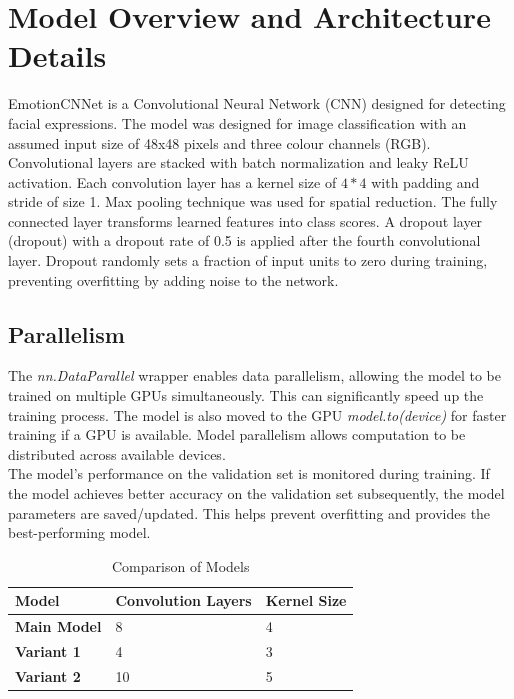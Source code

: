 \section{Model Overview and Architecture Details}
EmotionCNNet is a Convolutional Neural Network (CNN) designed for detecting facial expressions. The model was designed for image classification with an assumed input size of 48x48 pixels and three colour
channels (RGB). Convolutional layers are stacked with batch normalization and leaky ReLU activation. Each convolution layer has a kernel size of $ 4 * 4 $ with padding and stride of size 1. Max pooling technique was used for spatial reduction. The fully connected layer transforms learned features into class scores. A dropout layer (dropout) with a dropout rate of 0.5 is applied after the fourth convolutional layer. Dropout randomly sets a fraction of input units to zero during training, preventing overfitting by adding noise to the network.

\subsection*{Parallelism}
The \textit{nn.DataParallel} wrapper enables data parallelism, allowing the model to be trained on multiple GPUs simultaneously. This can significantly speed up the training process. The model is also moved to the GPU \textit{model.to(device)} for faster training if a GPU is available. Model parallelism allows computation to be distributed across available devices. \\

\noindent The model's performance on the validation set is monitored during training. If the model achieves better accuracy on the validation set subsequently, the model parameters are saved/updated. This helps prevent overfitting and provides the best-performing model.

\begin{table}[h!]
    \centering
    \begin{tabular}{ |p{4cm}|p{4cm}|p{4cm}| }
      \hline
      \textbf{Model} & \textbf{Convolution Layers} & \textbf{Kernel Size} \\
      \hline
      \textbf{Main Model} & 8 & 4\\
      \hline
      \textbf{Variant 1}  & 4 & 3\\
      \hline
      \textbf{Variant 2}  & 10 & 5\\
      \hline
    \end{tabular}
    \caption{Comparison of Models}
    \label{tab:model-comparison}
  \end{table}
 
